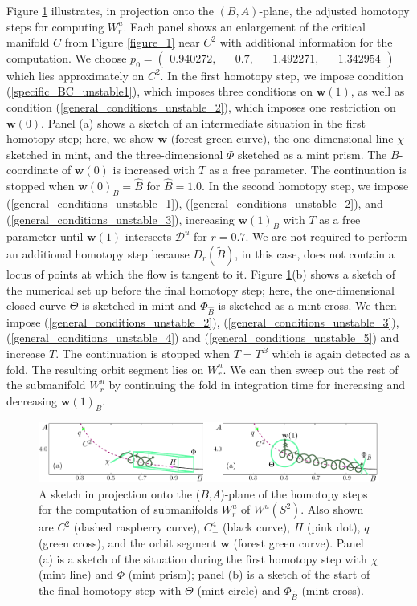 \documentclass{ws-ijbc}
\begin{document}
Figure \ref{figure_7} illustrates, in projection onto the $(B,A)$-plane, the adjusted homotopy steps for computing $W^u_r$.  Each panel shows an enlargement of the critical manifold $C$ from Figure \ref{figure_1} near $C^2$ with additional information for the computation.   We choose $p_0=\begin{pmatrix} 0.940272, && 0.7, && 1.492271, && 1.342954 \end{pmatrix}$ which lies approximately on $C^2$.  In the first homotopy step, we impose condition (\ref{specific_BC_unstable1}), which imposes three conditions on $\mathbf{w}(1)$, as well as condition (\ref{general_conditions_unstable_2}), which imposes one restriction on $\mathbf{w}(0)$.  Panel (a) shows a sketch of an intermediate situation in the first homotopy step; here, we show $\mathbf{w}$ (forest green curve), the one-dimensional line $\chi$ sketched in mint, and the three-dimensional $\Phi$ sketched as a mint prism.  The $B$-coordinate of $\mathbf{w}(0)$ is increased with $T$ as a free parameter.  The continuation is stopped when $\mathbf{w}(0)_B=\widehat{B}$ for $\widehat{B}=1.0$.  In the second homotopy step, we impose (\ref{general_conditions_unstable_1}), (\ref{general_conditions_unstable_2}), and (\ref{general_conditions_unstable_3}), increasing $\mathbf{w}(1)_B$ with $T$ as a free parameter until $\mathbf{w}(1)$ intersects $\mathscr{D}^u$ for $r=0.7$.  We are not required to perform an additional homotopy step because $D_r(\widetilde{B})$, in this case, does not contain a locus of points at which the flow is tangent to it.  Figure \ref{figure_7}(b) shows a sketch of the numerical set up before the final homotopy step; here, the one-dimensional closed curve $\Theta$ is sketched in mint and $\Phi_{\widehat{B}}$ is sketched as a mint cross. We then impose (\ref{general_conditions_unstable_2}), (\ref{general_conditions_unstable_3}), (\ref{general_conditions_unstable_4}) and (\ref{general_conditions_unstable_5}) and increase $T$.  The continuation is stopped when $T=T^B$ which is again detected as a fold.  The resulting orbit segment lies on $W^u_r$.  We can then sweep out the rest of the submanifold $W^u_r$ by continuing the fold in integration time for increasing and decreasing $\mathbf{w}(1)_B$.

\begin{figure}[H]
\centering
\includegraphics[]{./figures/MKMO_7.pdf}
\caption{A sketch in projection onto the ($B$,$A$)-plane of the homotopy steps for the computation of submanifolds $W^u_r$ of $W^u(S^2)$.  Also shown are $C^2$ (dashed raspberry curve), $C^4_-$ (black curve), $H$ (pink dot), $q$ (green cross), and the orbit segment $\mathbf{w}$ (forest green curve).  Panel (a) is a sketch of the situation during the first homotopy step with $\chi$ (mint line) and $\Phi$ (mint prism); panel (b) is a sketch of the start of the final homotopy step with $\Theta$ (mint circle) and $\Phi_{\widehat{B}}$ (mint cross).}
\label{figure_7}
\end{figure} 
\end{document}
